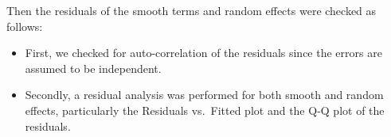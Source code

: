 \documentclass[
  letterpaper,
  DIV=11,
  numbers=noendperiod]{scrartcl}
\newenvironment{Shaded}{\begin{snugshade}}{\end{snugshade}}
\newcommand{\AttributeTok}[1]{\textcolor[rgb]{0.40,0.45,0.13}{#1}}
\newcommand{\CommentTok}[1]{\textcolor[rgb]{0.37,0.37,0.37}{#1}}
\newcommand{\FunctionTok}[1]{\textcolor[rgb]{0.28,0.35,0.67}{#1}}
\newcommand{\NormalTok}[1]{\textcolor[rgb]{0.00,0.23,0.31}{#1}}
\newcommand{\SpecialCharTok}[1]{\textcolor[rgb]{0.37,0.37,0.37}{#1}}
\newcommand{\StringTok}[1]{\textcolor[rgb]{0.13,0.47,0.30}{#1}}
\providecommand{\tightlist}{%
  \setlength{\itemsep}{0pt}\setlength{\parskip}{0pt}}\usepackage{longtable,booktabs,array}
\begin{document}
Then the residuals of the smooth terms and random effects were checked
as follows:

\begin{itemize}
\tightlist
\item
  First, we checked for auto-correlation of the residuals since the
  errors are assumed to be independent.
\end{itemize}

\begin{Shaded}
\end{Shaded}

\begin{itemize}
\tightlist
\item
  Secondly, a residual analysis was performed for both smooth and random
  effects, particularly the Residuals vs.~Fitted plot and the Q-Q plot
  of the residuals.
\end{itemize}
\end{document}
